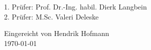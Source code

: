\documentclass[10pt,a4paper,bibliography=totocnumbered,listof=totocnumbered]{scrartcl}
\begin{document}
	\normalsize
		\begin{minipage}[t]{0.7\textwidth}
		\begin{addmargin}[1cm]{1cm}
			\begin{flushleft} %
			 1. Prüfer: Prof. Dr.-Ing. habil. Dierk Langbein \\ 
			 2. Prüfer: M.Sc. Valeri Deleske
					
					
				\end{flushleft}
		\end{addmargin}
		
		\end{minipage}
		\begin{minipage}[t]{0.3\textwidth}
			\begin{addmargin}[1cm]{1cm}
			\begin{flushright} %
				Eingereicht von Hendrik Hofmann \\{\today}
			\end{flushright}
			\end{addmargin}
		\end{minipage}

\pagebreak
\newpage
\thispagestyle{empty}


\newpage
\thispagestyle{empty}


\newpage
\thispagestyle{empty}


\renewcommand{\cfttabpresnum}{Tab. }
\renewcommand{\cftfigpresnum}{Abb. }
\settowidth{\cfttabnumwidth}{Abb. 10\quad}
\settowidth{\cftfignumwidth}{Abb. 10\quad}

\singlespacing
{}
\renewcommand{\contentsname}{I Inhaltsverzeichnis}

\addtocounter{section}{1}
\tableofcontents
\pagebreak

\pagebreak



\pagebreak
\end{document}
